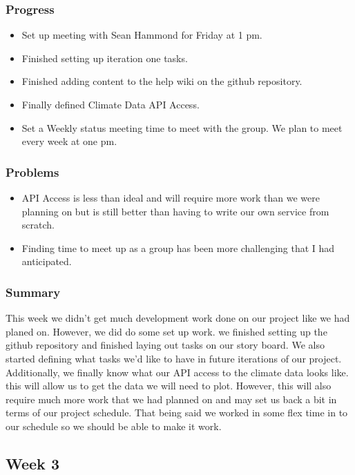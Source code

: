 \documentclass[onecolumn, draftclsnofoot,10pt, compsoc]{article}
\begin{document}
			\subsubsection{Progress}
				\begin{itemize}
					\item Set up meeting with Sean Hammond for Friday at 1 pm.
					\item Finished setting up iteration one tasks.
					\item Finished adding content to the help wiki on the github repository.
					\item Finally defined Climate Data API Access.
					\item Set a Weekly status meeting time to meet with the group. We plan to meet every week at one pm.
				\end{itemize}
			\subsubsection{Problems}
				\begin{itemize}
					\item API Access is less than ideal and will require more work than we were planning on but is still better than having to write our own service from scratch.
					\item Finding time to meet up as a group has been more challenging that I had anticipated.
				\end{itemize}

			\subsubsection{Summary}
			This week we didn't get much development work done on our project like we had planed on. However, we did do some set up work. we finished setting up the github repository and finished laying out tasks on our story board. We also started defining what tasks we'd like to have in future iterations of our project. Additionally, we finally know what our API access to the climate data looks like. this will allow us to get the data we will need to plot. However, this will also require much more work that we had planned on and may set us back a bit in terms of our project schedule. That being said we worked in some flex time in to our schedule so we should be able to make it work.\\

		\subsection{Week 3}
\end{document}
